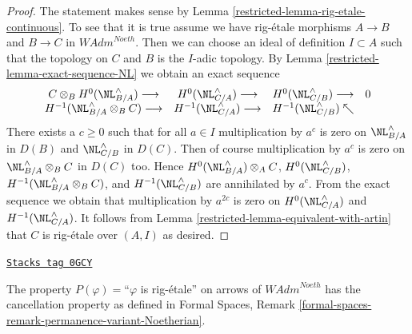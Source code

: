 \begin{proof}

The statement makes sense by
Lemma \ref{restricted-lemma-rig-etale-continuous}.
To see that it is true assume we have rig-\'etale morphisms
$A \to B$ and $B \to C$ in $\textit{WAdm}^{Noeth}$.
Then we can choose an ideal of definition $I \subset A$
such that the topology on $C$ and $B$ is the $I$-adic topology.
By Lemma \ref{restricted-lemma-exact-sequence-NL} we obtain an exact sequence
$$
\begin{array}{cccc}C \otimes_B H^0(\NL_{B/A}^\wedge) \longrightarrow & H^0(\NL_{C/A}^\wedge) \longrightarrow & H^0(\NL_{C/B}^\wedge) \longrightarrow & 0 \\ H^{-1}(\NL_{B/A}^\wedge \otimes_B C) \longrightarrow & H^{-1}(\NL_{C/A}^\wedge) \longrightarrow & H^{-1}(\NL_{C/B}^\wedge) \nwarrow & \end{array}
$$
There exists a $c \geq 0$ such that for all $a \in I$
multiplication by $a^c$ is zero on $\NL_{B/A}^\wedge$ in $D(B)$ and
$\NL_{C/B}^\wedge$ in $D(C)$. Then of course
multiplication by $a^c$ is zero on $\NL_{B/A}^\wedge \otimes_B C$
in $D(C)$ too. Hence
$H^0(\NL_{B/A}^\wedge) \otimes_A C$,
$H^0(\NL_{C/B}^\wedge)$,
$H^{-1}(\NL_{B/A}^\wedge \otimes_B C)$, and
$H^{-1}(\NL_{C/B}^\wedge)$
are annihilated by $a^c$. From the exact sequence
we obtain that multiplication by $a^{2c}$ is zero on
$H^0(\NL_{C/A}^\wedge)$ and $H^{-1}(\NL_{C/A}^\wedge)$.
It follows from Lemma \ref{restricted-lemma-equivalent-with-artin}
that $C$ is rig-\'etale over $(A, I)$ as desired.
\end{proof}

\begin{lemma}
\label{restricted-lemma-permanence-rig-etale-continuous}
\href{https://stacks.math.columbia.edu/tag/0GCY}{\texttt{Stacks tag 0GCY}}

The property $P(\varphi)=$``$\varphi$ is rig-\'etale''
on arrows of $\textit{WAdm}^{Noeth}$ has the cancellation property
as defined in Formal Spaces, Remark
\ref{formal-spaces-remark-permanence-variant-Noetherian}.
\end{lemma}

